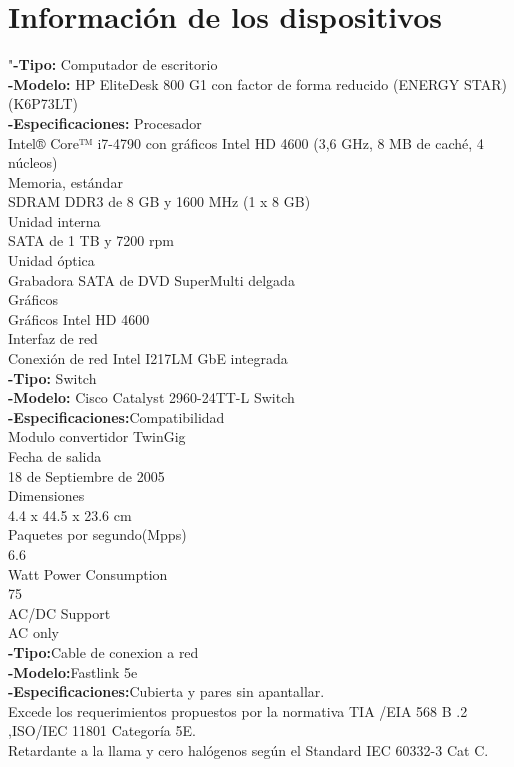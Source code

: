 \documentclass{udpreport}
\begin{document}
\section{Información de los dispositivos}
"{\bf-Tipo:} Computador de escritorio\\
{\bf-Modelo:}  HP EliteDesk 800 G1 con factor de forma reducido (ENERGY STAR)
(K6P73LT)\\
{\bf-Especificaciones:} Procesador\\
Intel® Core™ i7-4790 con gráficos Intel HD 4600 (3,6 GHz, 8 MB de caché, 4 núcleos)\\
Memoria, estándar\\
SDRAM DDR3 de 8 GB y 1600 MHz (1 x 8 GB)\\
Unidad interna\\
SATA de 1 TB y 7200 rpm\\
Unidad óptica\\
Grabadora SATA de DVD SuperMulti delgada\\
Gráficos\\
Gráficos Intel HD 4600\\
Interfaz de red\\
Conexión de red Intel I217LM GbE integrada\\
{\bf-Tipo:} Switch\\
{\bf-Modelo:} Cisco Catalyst 2960-24TT-L Switch\\
{\bf-Especificaciones:}Compatibilidad\\
Modulo convertidor TwinGig\\
Fecha de salida\\
18 de Septiembre de 2005\\
Dimensiones\\
4.4 x 44.5 x 23.6 cm\\
Paquetes por segundo(Mpps)\\
6.6\\
Watt Power Consumption\\	
75\\
AC/DC Support\\	
AC only\\
{\bf-Tipo:}Cable de conexion a red\\
{\bf-Modelo:}Fastlink 5e\\
{\bf-Especificaciones:}Cubierta y pares sin apantallar.\\
Excede los requerimientos propuestos por la normativa TIA /EIA 568 B .2 ,ISO/IEC 11801 Categoría 5E.\\
Retardante a la llama y cero halógenos según el Standard IEC 60332-3 Cat C.\\
\end{document}
